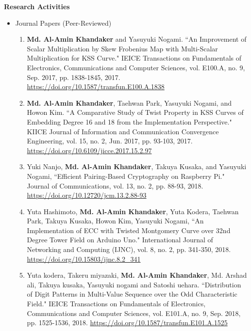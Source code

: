 
\newpage
\pagestyle{plain}
\textbf{\huge Research Activities}
\vspace{10mm}\\
\begin{itemize}
\large
\item Journal Papers (Peer-Reviewed)
\normalsize
\begin{enumerate}
	
	\item \textbf{Md. Al-Amin Khandaker} and Yasuyuki Nogami. ``An Improvement of Scalar Multiplication by Skew Frobenius Map with Multi-Scalar Multiplication for KSS Curve." IEICE Transactions on Fundamentals of Electronics, Communications and Computer Sciences, vol. E100.A, no. 9, Sep. 2017, pp. 1838-1845, 2017. \url{https://doi.org/10.1587/transfun.E100.A.1838}
	
	\item \textbf{Md. Al-Amin Khandaker}, Taehwan Park, Yasuyuki Nogami, and Howon Kim. ``A Comparative Study of Twist Property in KSS Curves of Embedding Degree 16 and 18 from the Implementation Perspective." KIICE Journal of Information and Communication Convergence Engineering, vol. 15, no. 2, Jun. 2017, pp. 93-103, 2017. \url{https://doi.org/10.6109/jicce.2017.15.2.97}
	
	\item Yuki Nanjo,  \textbf{Md. Al-Amin Khandaker}, Takuya Kusaka, and Yasuyuki Nogami, ``Efficient Pairing-Based Cryptography on Raspberry Pi." Journal of Communications, vol. 13, no. 2, pp. 88-93, 2018.  \url{https://doi.org/10.12720/jcm.13.2.88-93} 
		
	\item Yuta Hashimoto,  \textbf{Md. Al-Amin Khandaker}, Yuta Kodera, Taehwan Park, Takuya Kusaka, Howon Kim, Yasuyuki Nogami, ``An Implementation of ECC with Twisted Montgomery Curve over 32nd Degree Tower Field on Arduino Uno." International Journal of Networking and Computing (IJNC), vol. 8, no. 2, pp. 341-350, 2018.
	\url{https://doi.org/10.15803/ijnc.8.2_341}
	
	\item Yuta kodera, Takeru miyazaki, \textbf{Md. Al-Amin Khandaker},  Md. Arshad ali, Takuya kusaka, Yasuyuki nogami and Satoshi uehara. ``Distribution of Digit Patterns in Multi-Value Sequence over the Odd Characteristic Field." IEICE Transactions on Fundamentals of Electronics, Communications and Computer Sciences, vol. E101.A, no. 9, Sep. 2018, pp. 1525-1536, 2018. \url{https://doi.org/10.1587/transfun.E101.A.1525}
	

\end{enumerate}
\end{itemize}

